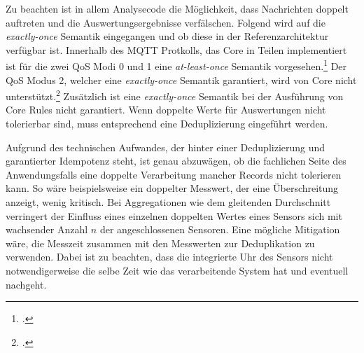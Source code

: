 Zu beachten ist in allem Analysecode die Möglichkeit, dass Nachrichten doppelt auftreten und die Auswertungsergebnisse verfälschen. Folgend wird auf die \textit{exactly-once} Semantik eingegangen und ob diese in der Referenzarchitektur verfügbar ist.
Innerhalb des MQTT Protkolls, das \AWSIOT{} Core in Teilen implementiert ist für die zwei  \ac{QoS} Modi 0 und 1 eine \textit{at-least-once} Semantik vorgesehen.\footcite[Vgl. auch im Folgenden][]{OASISOpenConsortium.2014} Der \ac{QoS} Modus 2, welcher eine \textit{exactly-once} Semantik garantiert, wird von \AWSIOT{} Core nicht unterstützt.\footcite[Vgl.][]{AmazonWebServicesInc..o.J.bd} Zusätzlich ist eine \textit{exactly-once} Semantik bei der Ausführung von \AWSIOT{} Core Rules nicht garantiert. Wenn doppelte Werte für Auswertungen nicht tolerierbar sind, muss entsprechend eine Deduplizierung eingeführt werden. 

Aufgrund des technischen Aufwandes, der hinter einer Deduplizierung und garantierter Idempotenz steht, ist genau abzuwägen, ob die fachlichen Seite des Anwendungsfalls eine doppelte Verarbeitung mancher Records nicht tolerieren kann. So wäre beispielsweise ein doppelter Messwert, der eine Überschreitung anzeigt, wenig kritisch. Bei Aggregationen wie dem gleitenden Durchschnitt verringert der Einfluss eines einzelnen doppelten Wertes eines Sensors sich mit wachsender Anzahl $n$ der angeschlossenen Sensoren. Eine mögliche Mitigation wäre, die Messzeit zusammen mit den Messwerten zur Deduplikation zu verwenden. Dabei ist zu beachten, dass die integrierte Uhr des Sensors nicht notwendigerweise die selbe Zeit wie das verarbeitende System hat und eventuell nachgeht.